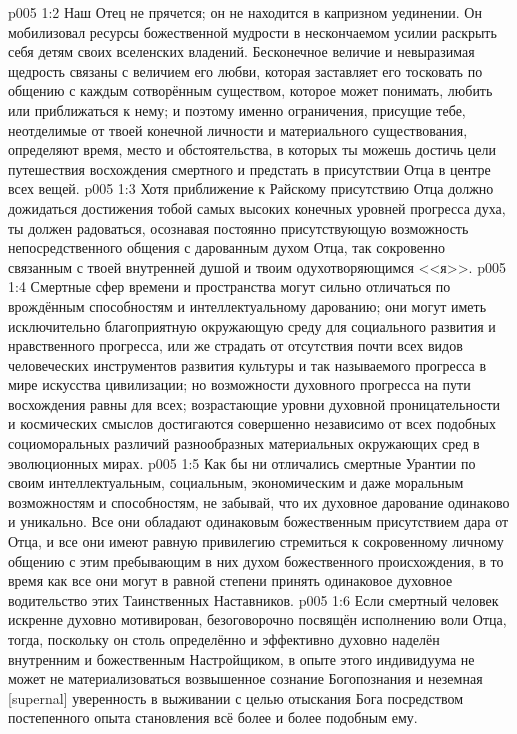 \vs p005 1:2 Наш Отец не прячется; он не находится в капризном уединении. Он мобилизовал ресурсы божественной мудрости в нескончаемом усилии раскрыть себя детям своих вселенских владений. Бесконечное величие и невыразимая щедрость связаны с величием его любви, которая заставляет его тосковать по общению с каждым сотворённым существом, которое может понимать, любить или приближаться к нему; и поэтому именно ограничения, присущие тебе, неотделимые от твоей конечной личности и материального существования, определяют время, место и обстоятельства, в которых ты можешь достичь цели путешествия восхождения смертного и предстать в присутствии Отца в центре всех вещей.
\vs p005 1:3 \pc Хотя приближение к Райскому присутствию Отца должно дожидаться достижения тобой самых высоких конечных уровней прогресса духа, ты должен радоваться, осознавая постоянно присутствующую возможность непосредственного общения с дарованным духом Отца, так сокровенно связанным с твоей внутренней душой и твоим одухотворяющимся <<я>>.
\vs p005 1:4 Смертные сфер времени и пространства могут сильно отличаться по врождённым способностям и интеллектуальному дарованию; они могут иметь исключительно благоприятную окружающую среду для социального развития и нравственного прогресса, или же страдать от отсутствия почти всех видов человеческих инструментов развития культуры и так называемого прогресса в мире искусства цивилизации; но возможности духовного прогресса на пути восхождения равны для всех; возрастающие уровни духовной проницательности и космических смыслов достигаются совершенно независимо от всех подобных социоморальных различий разнообразных материальных окружающих сред в эволюционных мирах.
\vs p005 1:5 Как бы ни отличались смертные Урантии по своим интеллектуальным, социальным, экономическим и даже моральным возможностям и способностям, не забывай, что их духовное дарование одинаково и уникально. Все они обладают одинаковым божественным присутствием дара от Отца, и все они имеют равную привилегию стремиться к сокровенному личному общению с этим пребывающим в них духом божественного происхождения, в то время как все они могут в равной степени принять одинаковое духовное водительство этих Таинственных Наставников.
\vs p005 1:6 \pc Если смертный человек искренне духовно мотивирован, безоговорочно посвящён исполнению воли Отца, тогда, поскольку он столь определённо и эффективно духовно наделён внутренним и божественным Настройщиком, в опыте этого индивидуума не может не материализоваться возвышенное сознание Богопознания и неземная [supernal] уверенность в выживании с целью отыскания Бога посредством постепенного опыта становления всё более и более подобным ему.
